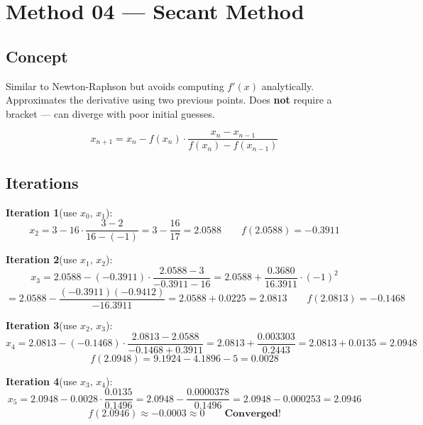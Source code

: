\documentclass[12pt]{article}
\begin{document}
\newpage

\section{Method 04 --- Secant Method}

\subsection*{Concept}
\begin{conceptbox}
Similar to Newton-Raphson but avoids computing $f'(x)$ analytically. Approximates the derivative using two previous points. Does \textbf{not} require a bracket — can diverge with poor initial guesses.
\end{conceptbox}

\vspace{8pt}

\begin{formulabox}
\[
  x_{n+1} = x_n - f(x_n)\cdot\frac{x_n - x_{n-1}}{f(x_n) - f(x_{n-1})}
\]
\end{formulabox}

\vspace{6pt}
\subsection*{Iterations}

\medskip
\noindent\textbf{Iteration 1}\;(use $x_0,\,x_1$):
\[
  x_2 = 3 - 16\cdot\frac{3-2}{16-(-1)} = 3 - \frac{16}{17} = \mathbf{2.0588}
  \qquad f(2.0588) = -0.3911
\]

\medskip
\noindent\textbf{Iteration 2}\;(use $x_1,\,x_2$):
\[
  x_3 = 2.0588 - (-0.3911)\cdot\frac{2.0588-3}{-0.3911-16}
      = 2.0588 + \frac{0.3680}{16.3911} \cdot(-1)^2
\]
\[
  = 2.0588 - \frac{(-0.3911)(-0.9412)}{-16.3911} = 2.0588 + 0.0225 = \mathbf{2.0813}
  \qquad f(2.0813) = -0.1468
\]

\medskip
\noindent\textbf{Iteration 3}\;(use $x_2,\,x_3$):
\[
  x_4 = 2.0813 - (-0.1468)\cdot\frac{2.0813-2.0588}{-0.1468+0.3911}
      = 2.0813 + \frac{0.003303}{0.2443} = 2.0813 + 0.0135 = \mathbf{2.0948}
\]
\[
  f(2.0948) = 9.1924-4.1896-5 = 0.0028
\]

\medskip
\noindent\textbf{Iteration 4}\;(use $x_3,\,x_4$):
\[
  x_5 = 2.0948 - 0.0028\cdot\frac{0.0135}{0.1496}
      = 2.0948 - \frac{0.0000378}{0.1496} = 2.0948 - 0.000253 = \mathbf{2.0946}
\]
\[
  f(2.0946)\approx -0.0003\approx 0 \qquad \textbf{Converged!}
\]
\end{document}
